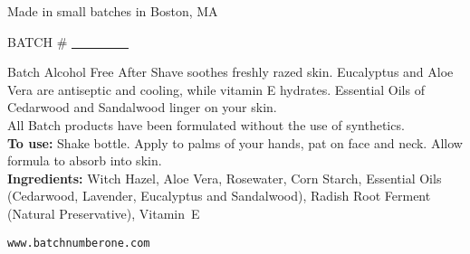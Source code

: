 \documentclass{article}
\begin{document}
\begin{center}
Made in small batches in Boston, MA
\end{center}

\begin{center}
BATCH \# \underline{ \ \ \ \ \ \ \ \ \ }
\end{center}

\noindent
Batch Alcohol Free After Shave soothes freshly razed skin. Eucalyptus
and Aloe Vera are antiseptic and cooling, while vitamin E
hydrates. Essential Oils of Cedarwood and Sandalwood linger on your
skin.
\\

\noindent
All Batch products have been formulated without the use of synthetics.
\\

\noindent
{\bf To use:}
Shake bottle.  Apply to palms of your hands, pat on
face and neck. Allow formula to absorb into skin.
\\

\noindent
{\bf Ingredients:} Witch Hazel, Aloe Vera, Rosewater, Corn Starch,
Essential Oils (Cedarwood, Lavender, Eucalyptus and Sandalwood),
Radish Root Ferment (Natural Preservative),
Vitamin~E


\begin{center}
{\tt www.batchnumberone.com}
\end{center}
\end{document}
